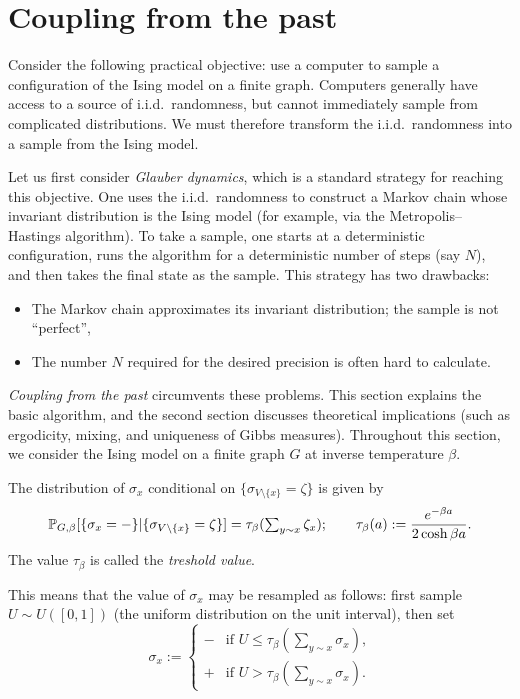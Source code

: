 \newpage 

\section{Coupling from the past}

Consider the following practical objective:
use a computer to sample a configuration of the Ising model on a finite graph.
Computers generally have access to a source of i.i.d.\ randomness,
but cannot immediately sample from complicated distributions.
We must therefore transform the i.i.d.\ randomness
into a sample from the Ising model.

Let us first consider \emph{Glauber dynamics},
which is a standard strategy for reaching this objective.
One uses the i.i.d.\ randomness
to construct a Markov chain whose invariant distribution is the Ising model
(for example, via the Metropolis--Hastings algorithm).
To take a sample, one starts at a deterministic configuration, runs the algorithm for a deterministic number of steps (say $N$),
and then takes the final state as the sample.
This strategy has two drawbacks:
\begin{itemize}
    \item The Markov chain approximates its invariant distribution;
    the sample is not ``perfect'',
    \item The number $N$ required for the desired precision is often hard to calculate.
\end{itemize}

\emph{Coupling from the past} circumvents these problems.
This section explains the basic algorithm,
and the second section discusses theoretical implications (such as ergodicity, mixing, and uniqueness of Gibbs measures).
Throughout this section, we consider the Ising model
on a finite graph $G$ at inverse temperature $\beta$.

\begin{definition}
    The distribution of $\sigma_x$ conditional on $\{\sigma_{V\setminus\{x\}}=\zeta\}$ is given by
    \[
        \P_{G,\beta}[\{\sigma_x=-\}|\{\sigma_{V\setminus\{x\}}=\zeta\}]
        =
        \tau_\beta({\textstyle\sum_{y\sim x}\zeta_x});
        \qquad
        \tau_\beta(a):=\frac{e^{-\beta a}}{2\cosh\beta a}.
    \]
    The value $\tau_\beta$ is called the \emph{treshold value}.
\end{definition}

This means that the value of $\sigma_x$ may be resampled as follows:
first sample $U\sim U([0,1])$ (the uniform distribution on the unit interval),
then set
\[
    \sigma_x:=\begin{cases}
        - &\text{if $U\leq \tau_\beta(\sum_{y\sim x}\sigma_x)$,}\\
        + &\text{if $U> \tau_\beta(\sum_{y\sim x}\sigma_x)$.}
    \end{cases}
\]

